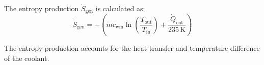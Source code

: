The entropy production \( \dot{S}_{\text{gen}} \) is calculated as:  
\[
\dot{S}_{\text{gen}} = - \left( \dot{m} c_{\text{wm}} \ln \left( \frac{T_{\text{out}}}{T_{\text{in}}} \right) + \frac{\dot{Q}_{\text{out}}}{235 \, \text{K}} \right)
\]  

The entropy production accounts for the heat transfer and temperature difference of the coolant.